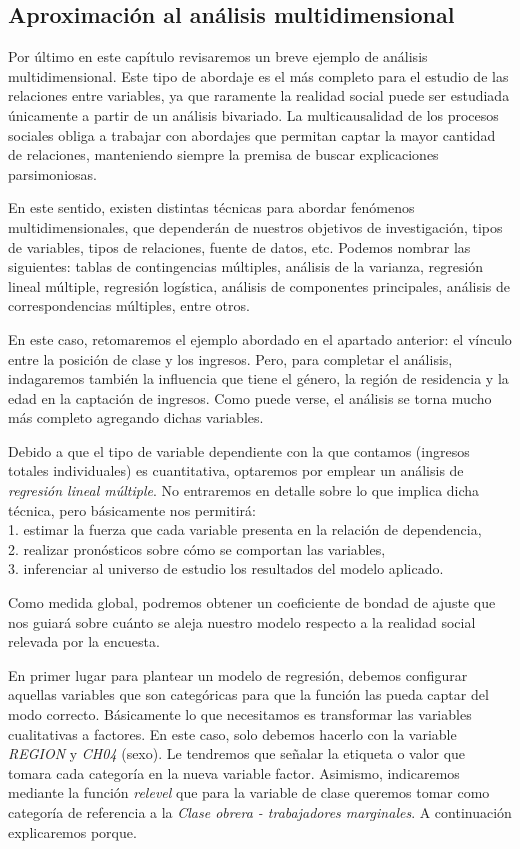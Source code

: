\documentclass[
]{article}
\begin{document}
\hypertarget{aprox}{%
\subsection{Aproximación al análisis multidimensional}\label{aprox}}

Por último en este capítulo revisaremos un breve ejemplo de análisis multidimensional. Este tipo de abordaje es el más completo para el estudio de las relaciones entre variables, ya que raramente la realidad social puede ser estudiada únicamente a partir de un análisis bivariado. La multicausalidad de los procesos sociales obliga a trabajar con abordajes que permitan captar la mayor cantidad de relaciones, manteniendo siempre la premisa de buscar explicaciones parsimoniosas.

En este sentido, existen distintas técnicas para abordar fenómenos multidimensionales, que dependerán de nuestros objetivos de investigación, tipos de variables, tipos de relaciones, fuente de datos, etc. Podemos nombrar las siguientes: tablas de contingencias múltiples, análisis de la varianza, regresión lineal múltiple, regresión logística, análisis de componentes principales, análisis de correspondencias múltiples, entre otros.

En este caso, retomaremos el ejemplo abordado en el apartado anterior: el vínculo entre la posición de clase y los ingresos. Pero, para completar el análisis, indagaremos también la influencia que tiene el género, la región de residencia y la edad en la captación de ingresos. Como puede verse, el análisis se torna mucho más completo agregando dichas variables.

Debido a que el tipo de variable dependiente con la que contamos (ingresos totales individuales) es cuantitativa, optaremos por emplear un análisis de \emph{regresión lineal múltiple}. No entraremos en detalle sobre lo que implica dicha técnica, pero básicamente nos permitirá:\\
1. estimar la fuerza que cada variable presenta en la relación de dependencia,\\
2. realizar pronósticos sobre cómo se comportan las variables,\\
3. inferenciar al universo de estudio los resultados del modelo aplicado.

Como medida global, podremos obtener un coeficiente de bondad de ajuste que nos guiará sobre cuánto se aleja nuestro modelo respecto a la realidad social relevada por la encuesta.

En primer lugar para plantear un modelo de regresión, debemos configurar aquellas variables que son categóricas para que la función las pueda captar del modo correcto. Básicamente lo que necesitamos es transformar las variables cualitativas a factores. En este caso, solo debemos hacerlo con la variable \emph{REGION} y \emph{CH04} (sexo). Le tendremos que señalar la etiqueta o valor que tomara cada categoría en la nueva variable factor. Asimismo, indicaremos mediante la función \emph{relevel} que para la variable de clase queremos tomar como categoría de referencia a la \emph{Clase obrera - trabajadores marginales}. A continuación explicaremos porque.
\end{document}
